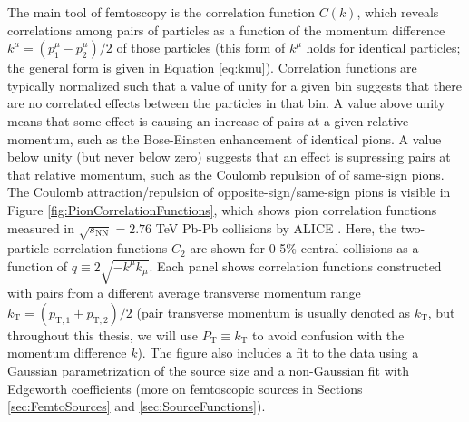 The main tool of femtoscopy is the correlation function $C(k)$, which reveals correlations among pairs of particles as a function of the momentum difference $k^\mu = (p_1^\mu - p_2^\mu)/2$ of those particles (this form of $k^\mu$ holds for identical particles; the general form is given in Equation \ref{eq:kmu}).
Correlation functions are typically normalized such that a value of unity for a given bin suggests that there are no correlated effects between the particles in that bin.
A value above unity means that some effect is causing an increase of pairs at a given relative momentum, such as the Bose-Einsten enhancement of identical pions. 
A value below unity (but never below zero) suggests that an effect is supressing pairs at that relative momentum, such as the Coulomb repulsion of of same-sign pions.
The Coulomb attraction/repulsion of opposite-sign/same-sign pions is visible in Figure \ref{fig:PionCorrelationFunctions}, which shows pion correlation functions measured in $\sqrt{s_\mathrm{NN}} = 2.76$ TeV Pb-Pb collisions by ALICE \cite{Abelev:2013pqa}.
Here, the two-particle correlation functions $C_2$ are shown for 0-5\% central collisions as a function of $q \equiv 2 \sqrt{-k^\mu k_\mu}$.
Each panel shows correlation functions constructed with pairs from a different average transverse momentum range $k_\mathrm{T} = (p_\mathrm{T,1} + p_\mathrm{T,2})/2$ (pair transverse momentum is usually denoted as $k_\mathrm{T}$, but throughout this thesis, we will use $P_\mathrm{T} \equiv k_\mathrm{T}$ to avoid confusion with the momentum difference $k$). 
The figure also includes a fit to the data using a Gaussian parametrization of the source size and a non-Gaussian fit with Edgeworth coefficients \cite{Blinnikov:1997jq} (more on femtoscopic sources in Sections \ref{sec:FemtoSources} and \ref{sec:SourceFunctions}).

